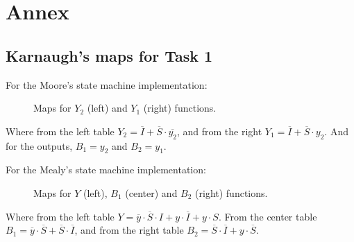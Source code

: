 \newpage
\section*{Annex}
\subsection*{Karnaugh's maps for Task 1}
For the Moore's state machine implementation:
\begin{figure}[H]
    \begin{center}
    \begin{Karnaugh}
    \end{Karnaugh}
    \begin{Karnaugh}
    \end{Karnaugh}
    \caption{Maps for $Y_2$ (left) and $Y_1$ (right) functions.}
    \end{center}
    \end{figure}
    
    Where from the left table $Y_2 = \overline{I} + \overline{S} \cdot \overline{y_2}$, 
    and from the right $Y_1 = \overline{I} + \overline{S} \cdot y_2$. And for
    the outputs, $B_1 = y_2$ and $B_2 = y_1$. 

For the Mealy's state machine implementation:

\begin{figure}[H]
    \begin{center}
         \begin{Karnaughvuit}
         \end{Karnaughvuit}
         \begin{Karnaughvuit}
         \end{Karnaughvuit}
         \begin{Karnaughvuit}
         \end{Karnaughvuit}
         \caption{Maps for $Y$ (left), $B_1$ (center) and $B_2$ (right) functions.}
    \end{center}
    \end{figure}
    Where from the left table $Y = \overline{y} \cdot \overline{S} \cdot I + y \cdot \overline{I} + y \cdot S$. 
    From the center table $B_1 = \overline{y} \cdot \overline{S} + \overline{S} \cdot \overline{I}$, and from the 
    right table $B_2 = \overline{S} \cdot \overline{I} + y \cdot \overline{S}$.
